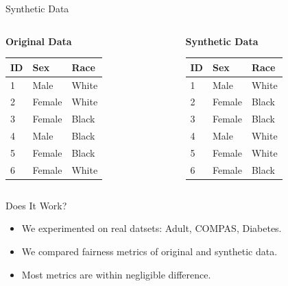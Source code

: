 \documentclass{beamer}
\begin{document}
\begin{frame}{Synthetic Data}
  \begin{columns}

    \begin{column}{0.48\textwidth}
      \centering
      \textbf{Original Data}
      \begin{tabular}{|l|l|l|}
        \hline
        \textbf{ID} & \textbf{Sex} & \textbf{Race} \\
        \hline
        1 & Male   & White \\
        2 & Female & White \\
        3 & Female & Black \\
        4 & Male   & Black \\
        5 & Female & Black \\
        6 & Female & White \\
        \hline
      \end{tabular}
    \end{column}

    \begin{column}{0.48\textwidth}
      \centering
      \textbf{Synthetic Data}
      \begin{tabular}{|l|l|l|}
        \hline
        \textbf{ID} & \textbf{Sex} & \textbf{Race} \\
        \hline
        1 & Male   & White \\
        2 & Female & Black \\
        3 & Female & Black \\
        4 & Male   & White \\
        5 & Female & White \\
        6 & Female & Black \\
        \hline
      \end{tabular}
    \end{column}
  \end{columns}
\end{frame}

\begin{frame}{Does It Work?}
  \begin{itemize}
    \item We experimented on real datsets: Adult, COMPAS, Diabetes.
    \item We compared fairness metrics of original and synthetic data.
    \item Most metrics are within negligible difference.
  \end{itemize}
\end{frame}
\end{document}
